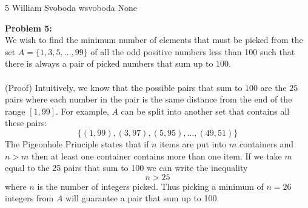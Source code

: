 \documentclass[12pt,letterpaper]{cos340hw}
\begin{document}
           {5}            %
           {William Svoboda}  %
           {wsvoboda}   %
           {None} 




\noindent\textbf{Problem 5:}\\
We wish to find the minimum number of elements that must be picked from the set $A=\{1,3,5,\dots,99\}$ 
of all the odd positive numbers less than 100 such that there is always a pair of picked numbers that 
sum up to 100.\\\\
(Proof) Intuitively, we know that the possible pairs that sum to $100$ are the $25$ pairs where each 
number in the pair is the same distance from the end of the range $[1,99]$. For example, $A$ can be
split into another set that contains all these pairs:
$$\{(1,99),(3,97),(5,95),\dots,(49,51)\}$$
The Pigeonhole Principle states that if $n$ items are put into $m$ containers and $n>m$ then at least 
one container contains more than one item. If we take $m$ equal to the 25 pairs that sum to 100 we 
can write the inequality
$$n>25$$
where $n$ is the number of integers picked. Thus picking a minimum of $n=26$ integers from $A$ will
guarantee a pair that sum up to 100.

\end{document}
